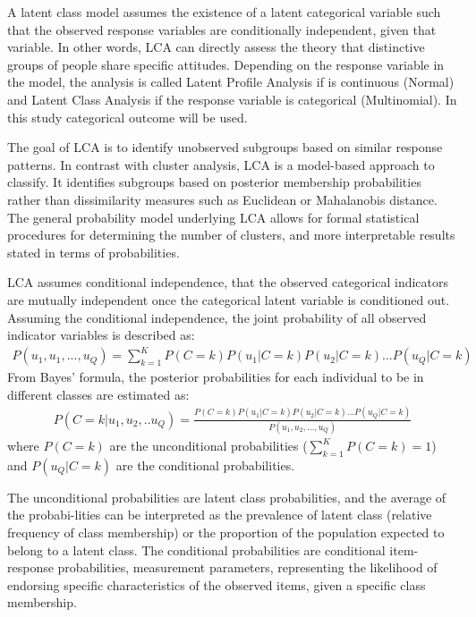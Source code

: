 \documentclass[12pt,a4paper,oneside]{reedthesis}
\begin{document}
A latent class model assumes the existence of a latent categorical variable such that the observed response variables are conditionally independent, given that variable. In other words, LCA can directly assess the theory that distinctive groups of people share specific attitudes. Depending on the response variable in the model, the analysis is called Latent Profile Analysis if is continuous (Normal) and Latent Class Analysis if the response variable is categorical (Multinomial). In this study categorical outcome will be used.

The goal of LCA is to identify unobserved subgroups based on similar response patterns. In contrast with cluster analysis, LCA is a model-based approach to classify. It identifies subgroups based on posterior membership probabilities rather than dissimilarity measures such as Euclidean or Mahalanobis distance. The general probability model underlying LCA allows for formal statistical procedures for determining the number of clusters, and more interpretable results stated in terms of probabilities.

LCA assumes conditional independence, that the observed categorical indicators are mutually independent once the categorical latent variable is conditioned out. Assuming the conditional independence, the joint probability of all observed indicator variables is described as:
\begin{align}
P(u_1,u_1,...,u_Q)= \sum_{k=1}^K{P(C=k)P(u_1|C=k)P(u_2|C=k)...P(u_Q|C=k)} \label{eq01}
\end{align}
From Bayes' formula, the posterior probabilities for each individual to be in different classes are estimated as:
\begin{align}
P(C=k|u_1,u_2,..u_Q)=\frac{P(C=k)P(u_1|C=k)P(u_2|C=k)...P(u_Q|C=k)}{P(u_1,u_2,...,u_Q)} \label{eq02}
\end{align}
where \(P(C=k)\) are the unconditional probabilities (\(\sum_{k=1}^KP(C=k)=1\)) and \(P(u_Q|C=k)\) are the conditional probabilities.

The unconditional probabilities are latent class probabilities, and the average of the probabi-lities can be interpreted as the prevalence of latent class (relative frequency of class membership) or the proportion of the population expected to belong to a latent class. The conditional probabilities are conditional item-response probabilities, measurement parameters, representing the likelihood of endorsing specific characteristics of the observed items, given a specific class membership.
\end{document}
